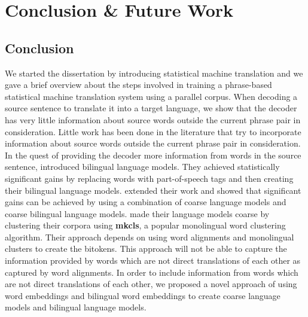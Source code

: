 %
%

\chapter{Conclusion \& Future Work}\label{conclusion}

\section{Conclusion}
We started the dissertation by introducing statistical machine translation and we gave a brief overview about the steps involved in training a phrase-based statistical machine translation system using a parallel corpus. When decoding a source sentence to translate it into a target language, we show that the decoder has very little information about source words outside the current phrase pair in consideration. Little work has been done in the literature that try to incorporate information about source words outside the current phrase pair in consideration. In the quest of providing the decoder more information from words in the source sentence, \cite{Niehues2011} introduced bilingual language models. They achieved statistically significant gains by replacing words with part-of-speech tags and then creating their bilingual language models. \cite{Stewart2014} extended their work and showed that significant gains can be achieved by using a combination of coarse language models and coarse bilingual language models. \cite{Stewart2014} made their language models coarse by clustering their corpora using \textbf{mkcls}, a popular monolingual word clustering algorithm. Their approach depends on using word alignments and monolingual clusters to create the bitokens. This approach will not be able to capture the information provided by words which are not direct translations of each other as captured by word alignments. In order to include information from words which are not direct translations of each other, we proposed a novel approach of using word embeddings and bilingual word embeddings to create coarse language models and bilingual language models.

